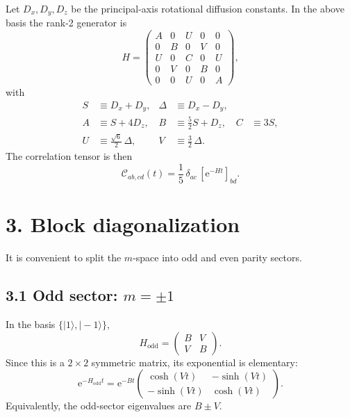 \documentclass[11pt]{article}
\newcommand{\e}{\mathrm{e}}
\newcommand{\cC}{\mathcal{C}}
\begin{document}
Let $D_x,D_y,D_z$ be the principal-axis rotational diffusion constants.  In the above basis the rank-2 generator is
\begin{equation}
H=
\begin{pmatrix}
A & 0 & U & 0 & 0 \\
0 & B & 0 & V & 0 \\
U & 0 & C & 0 & U \\
0 & V & 0 & B & 0 \\
0 & 0 & U & 0 & A
\end{pmatrix},
\end{equation}
with
\begin{align}
S &\equiv D_x+D_y, & \Delta &\equiv D_x-D_y, \\
A &\equiv S+4D_z, & B &\equiv \frac{5}{2}S+D_z, & C &\equiv 3S, \\
U &\equiv \frac{\sqrt{6}}{2}\,\Delta, & V &\equiv \frac{3}{2}\,\Delta.
\end{align}
The correlation tensor is then
\begin{equation}
\boxed{\cC_{ab,cd}(t)=\frac{1}{5}\,\delta_{ac}\,[\e^{-Ht}]_{bd}.}
\end{equation}

\section*{3. Block diagonalization}

It is convenient to split the $m$-space into odd and even parity sectors.

\subsection*{3.1 Odd sector: $m=\pm1$}

In the basis $\{|1\rangle,|-1\rangle\}$,
\begin{equation}
H_{\mathrm{odd}}=
\begin{pmatrix}
B & V\\
V & B
\end{pmatrix}.
\end{equation}
Since this is a $2\times 2$ symmetric matrix, its exponential is elementary:
\begin{equation}
\e^{-H_{\mathrm{odd}}t}
=
\e^{-Bt}
\begin{pmatrix}
\cosh(Vt) & -\sinh(Vt)\\
-\sinh(Vt) & \cosh(Vt)
\end{pmatrix}.
\end{equation}
Equivalently, the odd-sector eigenvalues are $B\pm V$.
\end{document}
